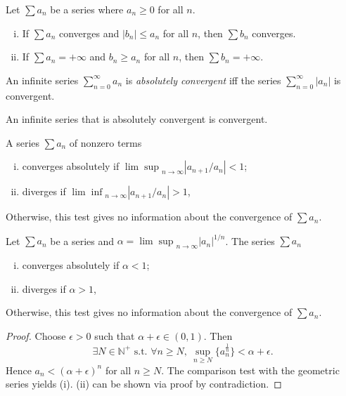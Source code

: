 \begin{thm}
  \label{thm:comparisonTest}
  Let $\sum a_n$ be a series where $a_n\ge 0$ for all $n$.
  \begin{enumerate}[(i)]\itemsep0em
  \item If $\sum a_n$ converges and $|b_n|\le a_n$ for all $n$,
    then $\sum b_n$ converges.
  \item If $\sum a_n=+\infty$ and $b_n \ge a_n$ for all $n$,
    then \mbox{$\sum b_n=+\infty$}.
  \end{enumerate}
\end{thm}

\begin{defn}
  \label{def:absoluteConvergence}
  An infinite series $\sum_{n=0}^{\infty} a_n$
  is \emph{absolutely convergent}
  iff the series $\sum_{n=0}^{\infty} |a_n|$ is convergent.
\end{defn}

\begin{lem}
  \label{lem:absolutelyConvergenceSeriesConverge}
  An infinite series that is absolutely convergent
  is convergent.
\end{lem}

\begin{thm}
  \label{thm:ratioTest}
  A series $\sum a_n$ of nonzero terms
  \begin{enumerate}[(i)]\itemsep0em
  \item converges absolutely if ${\lim\sup}_{n\rightarrow\infty}|a_{n+1}/a_n|<1$;
  \item diverges if ${\lim\inf}_{n\rightarrow\infty}|a_{n+1}/a_n|>1$,
  \end{enumerate}
  Otherwise, this test gives no information
  about the convergence of $\sum a_n$.
\end{thm}

\begin{thm}
  \label{thm:rootTest}
  Let $\sum a_n$ be a series and $\alpha={\lim\sup}_{n\rightarrow\infty}|a_n|^{1/n}$.
  The series $\sum a_n$
  \begin{enumerate}[(i)]\itemsep0em
  \item converges absolutely if $\alpha<1$;
  \item diverges if $\alpha>1$,
  \end{enumerate}
  Otherwise, this test gives no information
  about the convergence of $\sum a_n$.
\end{thm}
\begin{proof}
  Choose $\epsilon>0$ such that $\alpha+\epsilon\in (0,1)$.
  Then 
  \begin{displaymath}
    \exists N\in \mathbb{N}^+ \text{ s.t. }
    \forall n\ge N, \ \sup_{n\ge N}\{ a_n^{\frac{1}{n}}\} < \alpha+\epsilon.
  \end{displaymath}
  Hence $a_n<(\alpha+\epsilon)^n$ for all $n\ge N$.
  The comparison test with the geometric series yields (i).
  (ii) can be shown via proof by contradiction.
\end{proof}

